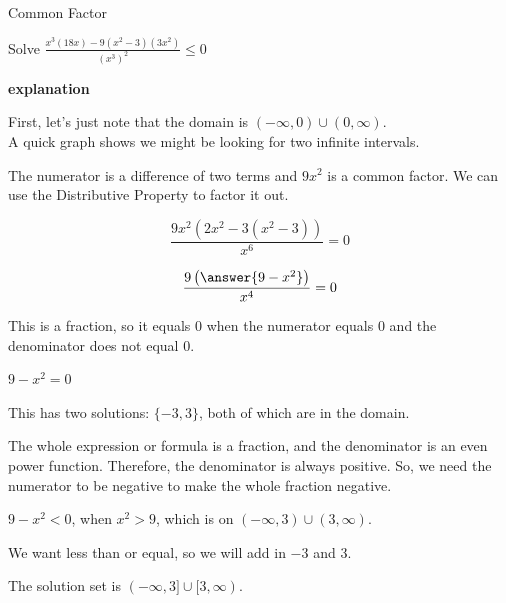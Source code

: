 \documentclass{ximera}
\begin{document}
\begin{example}  Common Factor


Solve $\frac{x^3 (18x) - 9(x^2-3)(3x^2)}{(x^3)^2} \leq 0$



\textbf{\textcolor{red!75!green}{explanation}} 

First, let's just note that the domain is $(-\infty, 0) \cup (0, \infty)$. \\

A quick graph shows we might be looking for two infinite intervals.



\begin{center}
\end{center}







The numerator is a difference of two terms and $9 x^2$ is a common factor.  We can use the Distributive Property to factor it out.



\[ \frac{9x^2 (2x^2 - 3(x^2-3))}{x^6} = 0 \]


\[ \frac{9 \left( \answer{9 - x^2} \right)}{x^4} = 0 \]



This is a fraction, so it equals $0$ when the numerator equals $0$ and the denominator does not equal $0$.


$9 - x^2 = 0$

This has two solutions: $\{ -3, 3  \}$, both of which are in the domain. 


The whole expression or formula is a fraction, and the denominator is an even power function. Therefore, the denominator is always positive. So, we need the numerator to be negative to make the whole fraction negative.


$9 - x^2 < 0$, when $x^2 > 9$, which is on $(-\infty, 3) \cup (3, \infty)$.

We want less than or equal, so we will add in $-3$ and $3$.


The solution set is $(-\infty, 3] \cup [3, \infty)$.




\end{example}
\end{document}
